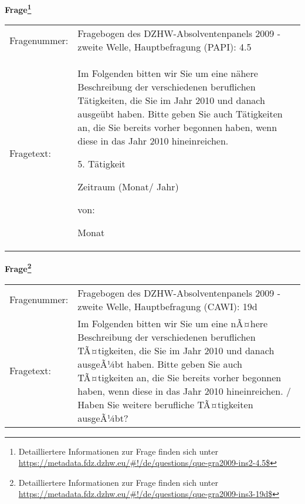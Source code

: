 				\vspace*{0.5cm}
                \noindent\textbf{Frage\footnote{Detailliertere Informationen zur Frage finden sich unter
		              \url{https://metadata.fdz.dzhw.eu/\#!/de/questions/que-gra2009-ins2-4.5$}}}\\
				\begin{tabularx}{\hsize}{@{}lX}
					Fragenummer: &
					  Fragebogen des DZHW-Absolventenpanels 2009 - zweite Welle, Hauptbefragung (PAPI):
					  4.5
 \\
					Fragetext: & Im Folgenden bitten wir Sie um eine nähere Beschreibung der verschiedenen beruflichen Tätigkeiten, die Sie im Jahr 2010 und danach ausgeübt haben. Bitte geben Sie auch Tätigkeiten an, die Sie bereits vorher begonnen haben, wenn diese in das Jahr 2010 hineinreichen.\par  5. Tätigkeit\par  Zeitraum (Monat/ Jahr)\par  von:\par  Monat \\
				\end{tabularx}
				\vspace*{0.5cm}
                \noindent\textbf{Frage\footnote{Detailliertere Informationen zur Frage finden sich unter
		              \url{https://metadata.fdz.dzhw.eu/\#!/de/questions/que-gra2009-ins3-19d$}}}\\
				\begin{tabularx}{\hsize}{@{}lX}
					Fragenummer: &
					  Fragebogen des DZHW-Absolventenpanels 2009 - zweite Welle, Hauptbefragung (CAWI):
					  19d
 \\
					Fragetext: & Im Folgenden bitten wir Sie um eine nÃ¤here Beschreibung der verschiedenen beruflichen TÃ¤tigkeiten, die Sie im Jahr 2010 und danach ausgeÃ¼bt haben. Bitte geben Sie auch TÃ¤tigkeiten an, die Sie bereits vorher begonnen haben, wenn diese in das Jahr 2010 hineinreichen. / Haben Sie weitere berufliche TÃ¤tigkeiten ausgeÃ¼bt? \\
				\end{tabularx}





